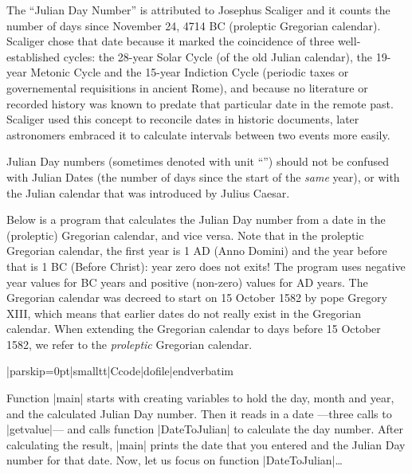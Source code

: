   
The ``Julian Day Number'' is attributed to Josephus Scaliger and it counts the number of days since
November 24, 4714 BC (proleptic Gregorian calendar). Scaliger chose that date
because it marked the coincidence of three well-established cycles: the
28-year Solar Cycle (of the old Julian calendar), the 19-year Metonic Cycle and
the 15-year Indiction Cycle (periodic taxes or governemental requisitions in
ancient Rome), and because no literature or recorded history was known to
predate that particular date in the remote past. Scaliger used this concept
to reconcile dates in historic documents, later astronomers embraced it
to calculate intervals between two events more easily.

Julian Day numbers (sometimes denoted with unit ``'') should not be confused
with Julian Dates (the number of days since the start of the {\it same\/} year),
or with the Julian calendar that was introduced by Julius Caesar.

Below is a program that calculates the Julian Day number from a date in the
(proleptic) Gregorian calendar, and vice versa. Note that in the proleptic
Gregorian calendar, the first year is 1 AD (Anno Domini) and the
year before that is 1 BC (Before Christ): year zero does not exits! The program
uses negative year values for BC years and positive (non-zero) values for AD
years. The Gregorian calendar was decreed to start on 15 October 1582 by pope
Gregory XIII, which means that earlier dates do not really exist in the
Gregorian calendar. When extending the Gregorian calendar to days before 15
October 1582, we refer to the {\it proleptic\/} Gregorian calendar.

\bigskip{}
\verbatim|parskip=0pt|smalltt|Ccode|dofile|endverbatim\endlistingx

Function |main| starts with creating variables to hold the day, month and year,
and the calculated Julian Day number. Then it reads in a date ---three calls to
|getvalue|--- and calls function |DateToJulian| to calculate the day number.
After calculating the result, |main| prints the date that you entered and the
Julian Day number for that date. Now, let us focus on function |DateToJulian|\dots

